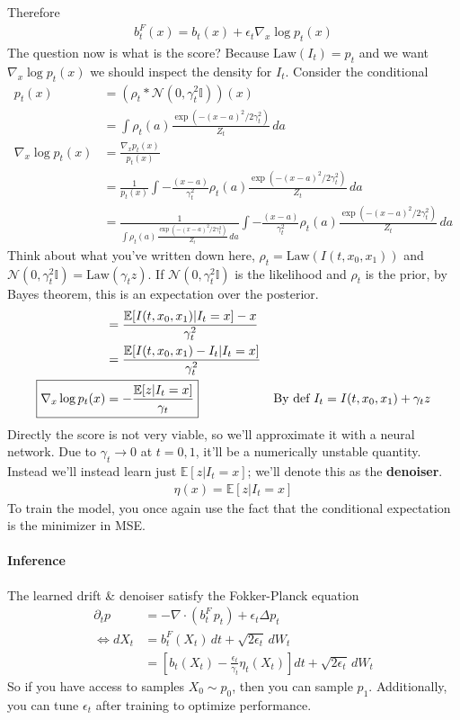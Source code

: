 Therefore
\begin{align}
	\boxed{b^F_t(x) = b_t(x) + \epsilon_t \nabla_x \log p_t(x)}
\end{align}
The question now is what is the score?
Because $\text{Law}(I_t) = p_t$ and we want $\nabla_x \log p_t(x)$ we should inspect the density for $I_t$. Consider the conditional
\begin{align}
	p_t(x) & = (\rho_t * \mathcal N(0, \gamma_t^2 \mathbb I))(x)\\
	& = \int \rho_t(a) \frac{\exp(-(x-a)^2/2\gamma_t^2)}{Z_t} \, da\\
	\nabla_x \log p_t(x) & = \frac{\nabla_x p_t(x)}{p_t(x)} \\
	& = \frac{1}{p_t(x)}\int -\frac{(x-a)}{\gamma_t^2}\rho_t(a) \frac{\exp(-(x-a)^2/2\gamma_t^2)}{Z_t} \, da\\
	& = \frac{1}{ \int \rho_t(a) \frac{\exp(-(x-a)^2/2\gamma_t^2)}{Z_t} \, da} \int -\frac{(x-a)}{\gamma_t^2}\rho_t(a) \frac{\exp(-(x-a)^2/2\gamma_t^2)}{Z_t} \, da
\end{align}
Think about what you've written down here, $\rho_t = \text{Law}(I(t,x_0,x_1))$ and $\mathcal N(0, \gamma_t^2 \mathbb I) = \text{Law}(\gamma_t z )$. If $\mathcal N(0, \gamma_t^2 \mathbb I)$ is the likelihood and $\rho_t$ is the prior, by Bayes theorem, this is an expectation over the posterior.
\begin{align}
	& = \frac{\mathbb E[I(t,x_0,x_1) | I_t = x]  - x}{\gamma_t^2}\\
	& = \frac{\mathbb E[I(t,x_0, x_1) - I_t | I_t =x]}{\gamma_t^2}\\
	\Aboxed{\nabla_x \log p_t(x) & = - \frac{\mathbb E[z|I_t = x]}{\gamma_t}} & \text{By def } I_t = I(t,x_0,x_1) + \gamma_t z
\end{align}
Directly the score is not very viable, so we'll approximate it with a neural network. Due to $\gamma_t \to 0$ at $t=0,1$, it'll be a numerically unstable quantity. Instead we'll instead learn just $\mathbb E[z | I_t = x]$; we'll denote this as the \textbf{denoiser}.
\begin{align}
	\boxed{\eta(x) = \mathbb E[z | I_t = x]}
\end{align}
To train the model, you once again use the fact that the conditional expectation is the minimizer in MSE.
\paragraph{Inference} The learned drift \& denoiser satisfy the Fokker-Planck equation
\begin{align}
	\partial_t p & = - \nabla \cdot (b_t^F \, p_t) + \epsilon_t \Delta p_t\\
	\iff dX_t & = b_t^F (X_t) \, dt + \sqrt{2 \epsilon_t} \, dW_t\\
	& =  \left[b_t(X_t) - \frac{\epsilon_t }{\gamma_t} \eta_t(X_t) \right] dt + \sqrt{2 \epsilon_t} \, dW_t 
\end{align}
So if you have access to samples $X_0 \sim p_0$, then you can sample $p_1$. Additionally, you can tune $\epsilon_t$ after training to optimize performance.








